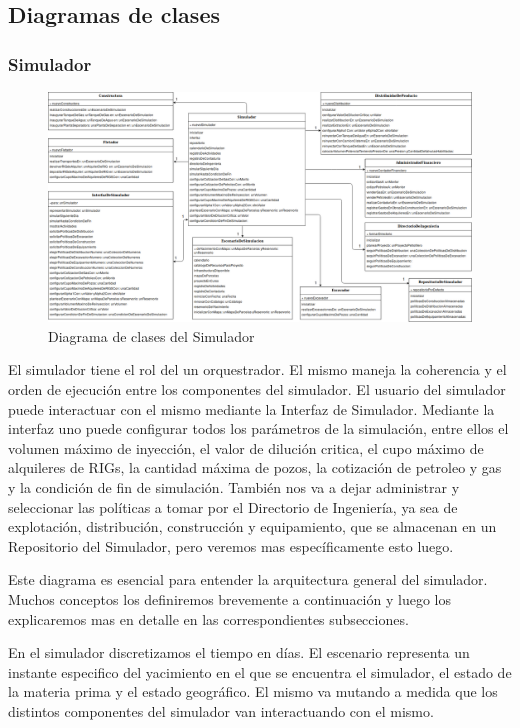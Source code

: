 \documentclass[10pt,a4paper]{article}
\begin{document}
\subsection{Diagramas de clases}

\subsubsection{Simulador}

\begin{figure}[H]
\centerline{\includegraphics[scale=0.36]{images/DiagramaDeClases_deSimulador.png}}
\caption{Diagrama de clases del Simulador}
\end{figure}

El simulador tiene el rol del un orquestrador. El mismo maneja la coherencia y el orden de ejecución entre los componentes del simulador. El usuario del simulador puede interactuar con el mismo mediante la Interfaz de Simulador. Mediante la interfaz uno puede configurar todos los parámetros de la simulación, entre ellos el volumen máximo de inyección, el valor de dilución critica, el cupo máximo de alquileres de RIGs, la cantidad máxima de pozos, la cotización de petroleo y gas y la condición de fin de simulación. También nos va a dejar administrar y seleccionar las políticas a tomar por el Directorio de Ingeniería, ya sea de explotación, distribución, construcción y equipamiento, que se almacenan en un Repositorio del Simulador, pero veremos mas específicamente esto luego.

Este diagrama es esencial para entender la arquitectura general del simulador. Muchos conceptos los definiremos brevemente a continuación y luego los explicaremos mas en detalle en las correspondientes subsecciones.

En el simulador discretizamos el tiempo en días. El escenario representa un instante especifico del yacimiento en el que se encuentra el simulador, el estado de la materia prima y el estado geográfico. El mismo va mutando a medida que los distintos componentes del simulador van interactuando con el mismo. 
\end{document}
